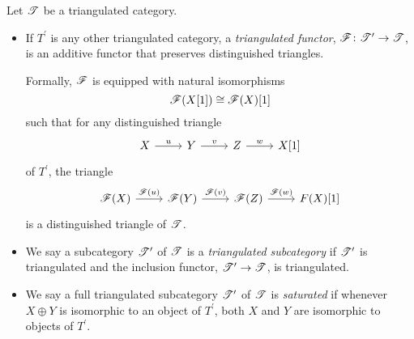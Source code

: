\documentclass[dissertation.tex]{subfiles}
\begin{document}
\begin{defn}
  Let $\mathscr{T}$ be a triangulated category.
  \begin{itemize}
  \item
    If $T^\prime$ is any other triangulated category, a {\it triangulated functor}, $\mathscr{F} \colon \mathscr{T}^\prime \rightarrow \mathscr{T}$, is an additive functor that preserves distinguished triangles.

    Formally, $\mathscr{F}$ is equipped with natural isomorphisms
    $$\mathscr{F}(X[1]) \cong \mathscr{F}(X)[1]$$
    such that for any distinguished triangle 
    $$\begin{tikzcd}
      X \arrow{r}{u} & Y \arrow{r}{v} & Z \arrow{r}{w} & X[1]
    \end{tikzcd}$$
    of $T^\prime$, the triangle
    $$\begin{tikzcd}
      \F(X) \arrow{r}{\F(u)} & \F(Y) \arrow{r}{\F(v)} & \F(Z) \arrow{r}{\F(w)} & F(X)[1]
    \end{tikzcd}$$
    is a distinguished triangle of $\mathscr{T}$.
  \item
    We say a subcategory $\mathscr{T}^\prime$ of $\mathscr{T}$ is a {\it triangulated subcategory} if $\mathscr{T}^\prime$ is triangulated and the inclusion functor, $\mathscr{T}^\prime \rightarrow \mathscr{T}$, is triangulated.
  \item
    We say a full triangulated subcategory $\mathscr{T}^\prime$ of $\mathscr{T}$ is {\it saturated} if whenever $X \oplus Y$ is isomorphic to an object of $T^\prime$, both $X$ and $Y$ are isomorphic to objects of $T^\prime$.
  \end{itemize}
\end{defn}
\end{document}

